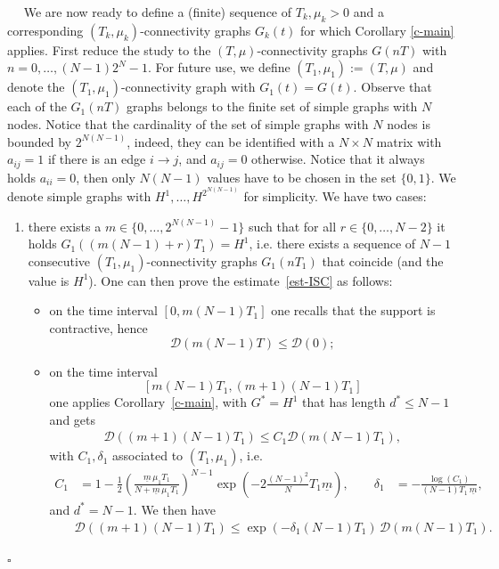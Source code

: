 \documentclass[journal]{article}
\newenvironment{proof}{{\it Proof.}~~}{\hfill$\square$}
\newcommand{\diam}[1]{\mathcal{D}(#1)}
\begin{document}
\begin{proof}
We are now ready to define a (finite) sequence of $T_k,\mu_k>0$ and a corresponding $(T_k,\mu_k)$-connectivity graphs $G_k(t)$ for which Corollary \ref{c-main} applies. First reduce the study to the $(T,\mu)$-connectivity graphs $G(nT)$ with $n=0,\ldots,(N-1)2^N-1$. For future use, we define $(T_1,\mu_1):=(T,\mu)$ and denote the $(T_1,\mu_1)$-connectivity graph with $G_1(t)=G(t)$. Observe that each of the $G_1(nT)$ graphs belongs to the finite set of simple graphs with $N$ nodes. Notice that the cardinality of the set of simple graphs with $N$ nodes is bounded by  $2^{N(N-1)}$, indeed, they can be identified with a $N\times N$ matrix with $a_{ij}=1$ if there is an edge $i\to j$, and $a_{ij}=0$ otherwise. Notice that it always holds $a_{ii}=0$, then only $N(N-1)$ values have to be chosen in the set $\{0,1\}$. We denote simple graphs with $H^1,\ldots, H^{2^{N(N-1)}}$ for simplicity. We have two cases:
\begin{enumerate}
\item there exists a $m\in \{0,\ldots, 2^{N(N-1)}-1\}$ such that for all $r\in\{0,\ldots,N-2\}$ it holds $G_1((m(N-1)+r)T_1)=H^1$, i.e. there exists a sequence of $N-1$ consecutive $(T_1,\mu_1)$-connectivity graphs $G_1(nT_1)$ that coincide (and the value is $H^1$). One can then prove the estimate~\eqref{est-ISC} as follows:
\begin{itemize}
\item on the time interval $[0,m(N-1)T_1]$ one recalls that the support is contractive, hence 
$$\diam{m(N-1)T}\leq \diam{0};$$
\item on the time interval $$[m(N-1)T_1,(m+1)(N-1)T_1]$$ one applies Corollary~\ref{c-main}, with $G^*=H^1$ that has length $d^*\leq N-1$ and gets
\begin{eqnarray*}
\diam{(m+1)(N-1)T_1}\leq C_1\diam{m(N-1)T_1},
\end{eqnarray*}
with $C_1,\delta_1$ associated to $(T_1,\mu_1)$, i.e.  
\begin{equation*}
\begin{aligned}
C_1 &= 1-\tfrac12\left( \tfrac{\underline{m}\,\mu_1 T_1}{N+\underline{m}\,\mu_1 T_1}    \right)^{N-1}\exp(-2\tfrac{(N-1)^2}{N}T_1 \underline{m}),
\qquad
\delta_1 &= -\frac{\log(C_1)}{(N-1)T_1\, \underline{m}},
\end{aligned}
\end{equation*}
and  $d^*=N-1$. We then have
\begin{eqnarray*}
&&\diam{(m+1)(N-1)T_1}\leq \exp(-\delta_1 (N-1)T_1)\, \diam{m(N-1)T_1}.
\end{eqnarray*}


\end{itemize}
\end{enumerate}
\end{proof}
\end{document}
